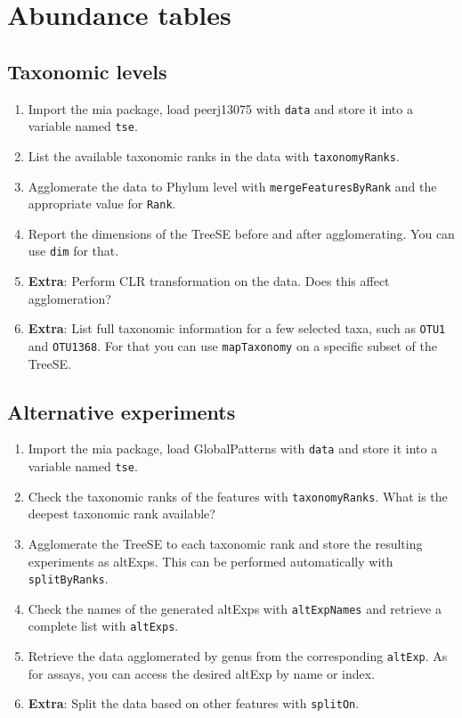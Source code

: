 \documentclass[
]{book}
\providecommand{\tightlist}{%
  \setlength{\itemsep}{0pt}\setlength{\parskip}{0pt}}
\begin{document}
\hypertarget{abundance-tables}{%
\section{Abundance tables}\label{abundance-tables}}

\hypertarget{taxonomic-levels}{%
\subsection{Taxonomic levels}\label{taxonomic-levels}}

\begin{enumerate}
\def\labelenumi{\arabic{enumi}.}
\tightlist
\item
  Import the mia package, load peerj13075 with \texttt{data} and store it into a
  variable named \texttt{tse}.
\item
  List the available taxonomic ranks in the data with \texttt{taxonomyRanks}.
\item
  Agglomerate the data to Phylum level with \texttt{mergeFeaturesByRank} and the
  appropriate value for \texttt{Rank}.
\item
  Report the dimensions of the TreeSE before and after agglomerating. You can
  use \texttt{dim} for that.
\item
  \textbf{Extra}: Perform CLR transformation on the data. Does this affect agglomeration?
\item
  \textbf{Extra}: List full taxonomic information for a few selected taxa, such as
  \texttt{OTU1} and \texttt{OTU1368}. For that you can use \texttt{mapTaxonomy} on a specific subset
  of the TreeSE.
\end{enumerate}

\hypertarget{alternative-experiments}{%
\subsection{Alternative experiments}\label{alternative-experiments}}

\begin{enumerate}
\def\labelenumi{\arabic{enumi}.}
\tightlist
\item
  Import the mia package, load GlobalPatterns with \texttt{data} and store it into a
  variable named \texttt{tse}.
\item
  Check the taxonomic ranks of the features with \texttt{taxonomyRanks}. What is the
  deepest taxonomic rank available?
\item
  Agglomerate the TreeSE to each taxonomic rank and store the resulting
  experiments as altExps. This can be performed automatically with \texttt{splitByRanks}.
\item
  Check the names of the generated altExps with \texttt{altExpNames} and retrieve a
  complete list with \texttt{altExps}.
\item
  Retrieve the data agglomerated by genus from the corresponding \texttt{altExp}.
  As for assays, you can access the desired altExp by name or index.
\item
  \textbf{Extra}: Split the data based on other features with \texttt{splitOn}.
\end{enumerate}
\end{document}

